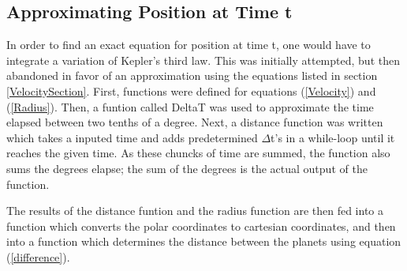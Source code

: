 \documentclass{article}
\begin{document}
\subsection{Approximating Position at Time t}
In order to find an exact equation for position at time t, one would have to integrate a variation of Kepler's
third law. This was initially attempted, but then abandoned in favor of an approximation using the equations listed in
section \ref{VelocitySection}. First, functions were defined for equations (\ref{Velocity}) and (\ref{Radius}). Then, a funtion called DeltaT was used to approximate the time elapsed between two tenths of a degree. Next, a distance function was written which takes a inputed time and adds predetermined $\Delta$t's in a while-loop until it reaches the given time. As these chuncks of time are summed, the function also sums the degrees elapse; the sum of the degrees is the actual output of the function. 

The results of the distance funtion and the radius function are then fed into a function which converts the polar coordinates to cartesian coordinates, and then into a function which determines the distance between the planets using equation (\ref{difference}).
\section{}
\end{document}
